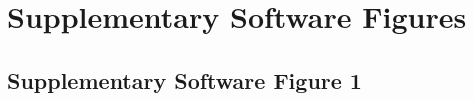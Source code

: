 \section{Supplementary Software Figures}

\renewcommand{\figurename}{Supplementary Software Fig.}


\setcounter{figure}{0}

\subsection{Supplementary Software Figure 1}

